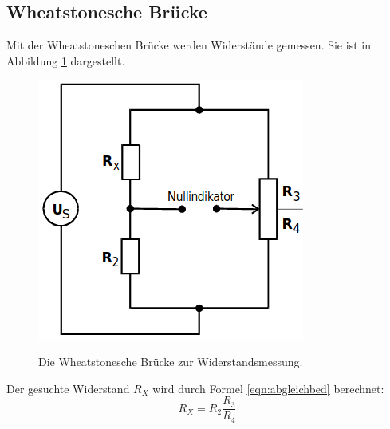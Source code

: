 \documentclass[titlepage = firstcover]{scrartcl}
\begin{document}
        \subsection{Wheatstonesche Brücke}
          Mit der Wheatstoneschen Brücke werden Widerstände gemessen. Sie ist in Abbildung \ref{fig:wheatstone} dargestellt.
          \begin{figure}[h]
            \centering
            \caption{Die Wheatstonesche Brücke zur Widerstandsmessung.}
            \includegraphics[width = 0.4\linewidth]{Wheatstoneschebruecke.png}
            \label{fig:wheatstone}
          \end{figure}
          Der gesuchte Widerstand $R_X$ wird durch Formel \eqref{eqn:abgleichbed} berechnet:
          \begin{equation}
            \label{eqn:abgleichbed}
            R_X = R_2 \frac{R_3}{R_4}
          \end{equation}
\end{document}
